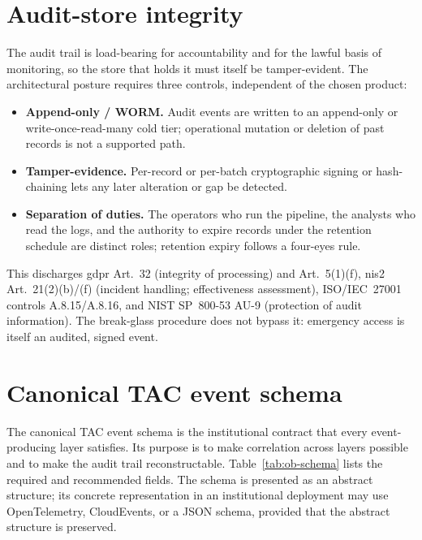\section{Audit-store integrity}
\label{sec:ob-integrity}

The audit trail is load-bearing for accountability and for the lawful
basis of monitoring, so the store that holds it must itself be
tamper-evident. The architectural posture requires three controls,
independent of the chosen product:
\begin{itemize}[nosep]
  \item \textbf{Append-only / WORM.} Audit events are written to an
    append-only or write-once-read-many cold tier; operational
    mutation or deletion of past records is not a supported path.
  \item \textbf{Tamper-evidence.} Per-record or per-batch cryptographic
    signing or hash-chaining lets any later alteration or gap be
    detected.
  \item \textbf{Separation of duties.} The operators who run the
    pipeline, the analysts who read the logs, and the authority to
    expire records under the retention schedule are distinct roles;
    retention expiry follows a four-eyes rule.
\end{itemize}
This discharges \gls{gdpr} Art.~32 (integrity of processing) and
Art.~5(1)(f), \gls{nis2} Art.~21(2)(b)/(f) (incident handling;
effectiveness assessment), ISO/IEC~27001
controls A.8.15/A.8.16, and NIST SP~800-53 AU-9 (protection of audit
information). The break-glass procedure does not bypass it: emergency
access is itself an audited, signed event.

\section{Canonical TAC event schema}
\label{sec:ob-schema}

The canonical TAC event schema is the institutional contract that
every event-producing layer satisfies. Its purpose is to make
correlation across layers possible and to make the audit trail
reconstructable. Table~\ref{tab:ob-schema} lists the required and
recommended fields. The schema is presented as an abstract structure;
its concrete representation in an institutional deployment may use
OpenTelemetry, CloudEvents, or a JSON schema, provided that the
abstract structure is preserved.

